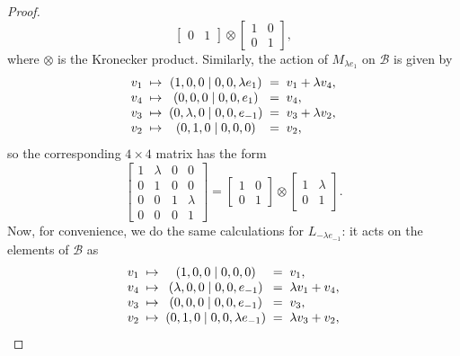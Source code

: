 \begin{proof}
\begin{equation*}
\begin{bmatrix}
			0 & 1
		\end{bmatrix} \otimes
		\begin{bmatrix}
			1 & 0 \\
			0 & 1
		\end{bmatrix},
	\end{equation*}
	where $\otimes$ is the Kronecker product. Similarly, the action of $M_{\lambda e_1}$ 
	on $\mathcal{B}$ is given by
	\begin{equation*}
		\begin{array}{r@{\;\;}c@{\;\;}c@{\;\;}c@{\;\;}l}
			v_1 & \mapsto & (1,0,0 \mid 0,0,\lambda e_{1}) & = & v_1 + \lambda v_4, \\
			v_4 & \mapsto & (0,0,0 \mid 0,0,e_1) & = & v_4, \\
			v_3 & \mapsto & (0,\lambda,0 \mid 0,0,e_{-1}) & = & v_3 + \lambda v_2, \\
			v_2 & \mapsto & (0,1,0 \mid 0,0,0) & = & v_2,
		\end{array}
	\end{equation*}
	so the corresponding $4\times 4$ matrix has the form
	\begin{equation*}
		\begin{bmatrix}
			1 & \lambda & 0 & 0 \\
			0 & 1 & 0 & 0 \\
			0 & 0 & 1 & \lambda \\
			0 & 0 & 0 & 1
		\end{bmatrix} = 
		\begin{bmatrix}
			1 & 0 \\
			0 & 1
		\end{bmatrix} \otimes
		\begin{bmatrix}
			1 & \lambda \\
			0 & 1 
		\end{bmatrix}. 
	\end{equation*}
	Now, for convenience, we do the same calculations for 
	$L_{ -\lambda e_{-1}}$: it acts on the elements
	of $\mathcal{B}$ as
	\begin{equation*}
		\begin{array}{r@{\;\;}c@{\;\;}c@{\;\;}c@{\;\;}l}
			v_1 & \mapsto & (1,0,0 \mid 0,0,0) & = & v_1, \\
			v_4 & \mapsto & (\lambda,0,0 \mid 0,0,e_{-1}) & = & \lambda v_1 + v_4, \\
			v_3 & \mapsto & (0,0,0 \mid 0,0,e_{-1}) & = & v_3, \\
			v_2 & \mapsto & (0,1,0 \mid 0,0,\lambda e_{-1}) & = & \lambda v_3 + v_2,
		\end{array}

\end{equation*}
\end{proof}
